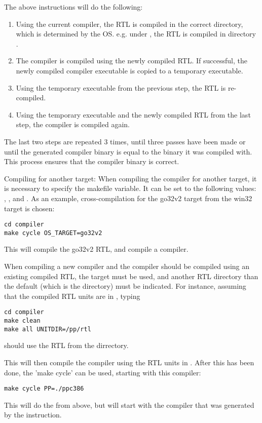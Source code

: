 {The above instructions will do the following:
\begin{enumerate}
\item Using the current compiler, the RTL is compiled in the correct
directory, which is determined by the OS. e.g. under \linux,
the RTL is compiled in directory .
\item The compiler is compiled using the newly compiled RTL. If successful,
the newly compiled compiler executable is copied to a temporary executable.
\item Using the temporary executable from the previous step, the RTL is
re-compiled.
\item Using the temporary executable and the newly compiled RTL from the
last step, the compiler is compiled again.
\end{enumerate}
The last two steps are repeated 3 times, until three passes have been made or
until the generated compiler binary is equal to the binary it was compiled
with. This process ensures that the compiler binary is correct.

Compiling for another target:
When compiling the compiler for another target, it is necessary to specify
the  makefile variable. It can be set to the following
values: , ,  and .
As an example, cross-compilation for the go32v2 target from the win32 target
is chosen:
\begin{verbatim}
cd compiler
make cycle OS_TARGET=go32v2
\end{verbatim}
This will compile the go32v2 RTL, and compile a  compiler.

When compiling a new compiler and the compiler should be compiled using an 
existing compiled RTL,  the  target must be used, and another RTL 
directory than the default (which is the  
directory) must be indicated. For instance, assuming that the compiled RTL 
units are in , typing
\begin{verbatim}
cd compiler
make clean
make all UNITDIR=/pp/rtl
\end{verbatim}
should use the RTL from the  dirrectory.

This will then compile the compiler using the RTL units in .
After this has been done, the 'make cycle' can be used, starting with this
compiler:
\begin{verbatim}
make cycle PP=./ppc386
\end{verbatim}
This will do the  from above, but will start with the compiler
that was generated by the  instruction.

}
